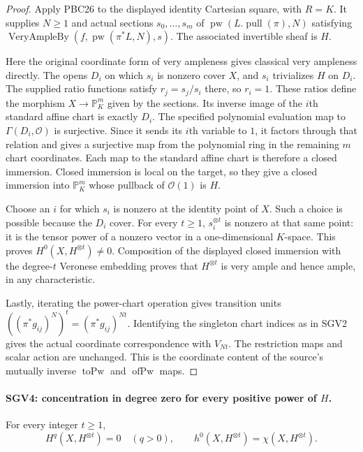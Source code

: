 \begin{proof}
Apply PBC26 to the displayed identity Cartesian square, with $R=K$.
It supplies $N\ge1$ and actual sections $s_0,\ldots,s_m$ of
$\operatorname{pw}(L.\operatorname{pull}(\pi),N)$ satisfying
$\operatorname{VeryAmpleBy}(f,\operatorname{pw}(\pi^*L,N),s)$.
The associated invertible sheaf is $H$.

Here the original coordinate form of very ampleness gives classical
very ampleness directly.  The opens $D_i$ on which $s_i$ is nonzero
cover $X$, and $s_i$ trivializes $H$ on $D_i$.  The supplied ratio
functions satisfy $r_j=s_j/s_i$ there, so $r_i=1$.
These ratios define the morphism $X\to\mathbb P^m_K$ given by the
sections.  Its inverse image of the $i$th standard affine chart is
exactly $D_i$.  The specified polynomial evaluation map to
$\Gamma(D_i,\mathcal O)$ is surjective.  Since it sends its $i$th
variable to $1$, it factors through that relation and gives a
surjective map from the polynomial ring in the remaining $m$ chart
coordinates.  Each map to the standard affine chart is therefore a
closed immersion.  Closed immersion is local on the target, so they
give a closed immersion into $\mathbb P^m_K$ whose pullback of
$\mathcal O(1)$ is $H$.

Choose an $i$ for which $s_i$ is nonzero at the identity point of $X$.
Such a choice is possible because the $D_i$ cover.  For every $t\ge1$,
$s_i^{\otimes t}$ is nonzero at that same point: it is the tensor
power of a nonzero vector in a one-dimensional $K$-space.
This proves $H^0(X,H^{\otimes t})\ne0$.  Composition of the displayed
closed immersion with the degree-$t$ Veronese embedding proves that
$H^{\otimes t}$ is very ample and hence ample, in any characteristic.

Lastly, iterating the power-chart operation gives transition units
$((\pi^*g_{ij})^N)^t=(\pi^*g_{ij})^{Nt}$.  Identifying the singleton
chart indices as in SGV2 gives the actual coordinate correspondence
with $V_{Nt}$.  The restriction maps and scalar action are unchanged.
This is the coordinate content of the source's mutually inverse
$\operatorname{toPw}$ and $\operatorname{ofPw}$ maps.
\end{proof}

\paragraph{SGV4: concentration in degree zero for every positive power of \(H\).}
\label{claim:SGV4}
For every integer $t\ge1$,
\[
 H^q(X,H^{\otimes t})=0\quad(q>0),\qquad
 h^0(X,H^{\otimes t})=\chi(X,H^{\otimes t}).
                                                        \tag{SGV.4}
\]

